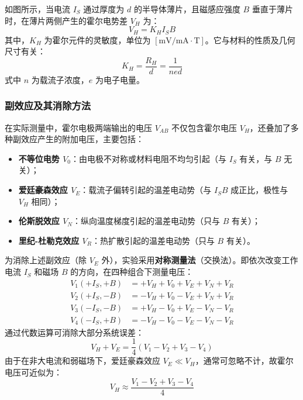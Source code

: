 \documentclass[11pt]{article}
\begin{document}
如图所示，当电流 $I_S$ 通过厚度为 $d$ 的半导体薄片，且磁感应强度 $B$ 垂直于薄片时，在薄片两侧产生的霍尔电势差 $V_H$ 为：
\begin{equation}
    V_H = K_H I_S B
\end{equation}
其中，$K_H$ 为霍尔元件的灵敏度，单位为 $[\text{mV}/\text{mA}\cdot\text{T}]$。它与材料的性质及几何尺寸有关：
\begin{equation}
    K_H = \frac{R_H}{d} = \frac{1}{n e d}
\end{equation}
式中 $n$ 为载流子浓度，$e$ 为电子电量。

\subsubsection{副效应及其消除方法}
在实际测量中，霍尔电极两端输出的电压 $V_{AB}$ 不仅包含霍尔电压 $V_H$，还叠加了多种副效应产生的附加电压，主要包括：
\begin{itemize}
    \item \textbf{不等位电势 $V_0$}：由电极不对称或材料电阻不均匀引起（与 $I_S$ 有关，与 $B$ 无关）；
    \item \textbf{爱廷豪森效应 $V_E$}：载流子偏转引起的温差电动势（与 $I_S B$ 成正比，极性与 $V_H$ 相同）；
    \item \textbf{伦斯脱效应 $V_N$}：纵向温度梯度引起的温差电动势（只与 $B$ 有关）；
    \item \textbf{里纪-杜勒克效应 $V_R$}：热扩散引起的温差电动势（只与 $B$ 有关）。
\end{itemize}

为消除上述副效应（除 $V_E$ 外），实验采用\textbf{对称测量法}（交换法）。即依次改变工作电流 $I_S$ 和磁场 $B$ 的方向，在四种组合下测量电压：
\begin{align}
    V_1 (+I_S, +B) &= +V_H + V_0 + V_E + V_N + V_R \\
    V_2 (+I_S, -B) &= -V_H + V_0 - V_E + V_N + V_R \\
    V_3 (-I_S, -B) &= +V_H - V_0 + V_E - V_N - V_R \\
    V_4 (-I_S, +B) &= -V_H - V_0 - V_E - V_N - V_R
\end{align}
通过代数运算可消除大部分系统误差：
\begin{equation}
    V_H + V_E = \frac{1}{4}(V_1 - V_2 + V_3 - V_4)
\end{equation}
由于在非大电流和弱磁场下，爱廷豪森效应 $V_E \ll V_H$，通常可忽略不计，故霍尔电压可近似为：
\begin{equation}
    V_H \approx \frac{V_1 - V_2 + V_3 - V_4}{4}
\end{equation}
\end{document}
